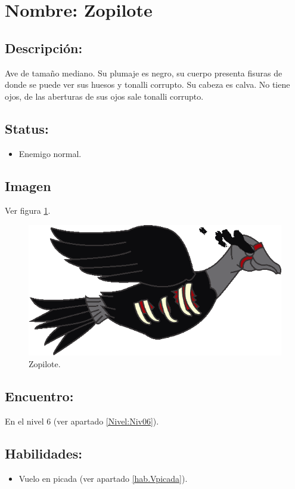 \section{Nombre: Zopilote}   \label{per:zopilote}
\subsection{Descripción:}
Ave de tamaño mediano. Su plumaje es negro, su cuerpo presenta fisuras de donde se puede ver sus huesos y tonalli corrupto. Su cabeza es calva. No tiene ojos, de las aberturas de sus ojos sale tonalli corrupto. 
\subsection{Status:}
\begin{itemize}
	\item Enemigo normal.
\end{itemize}
\subsection{Imagen}
Ver figura \ref{fig:zopilote}.
\begin{figure}
	\centering
	\includegraphics[height=0.2 \textheight]{Imagenes/zopilote}
	\caption{Zopilote.}
	\label{fig:zopilote}
\end{figure}
\subsection{Encuentro:}
En el nivel 6 (ver apartado \ref{Nivel:Niv06}).
\subsection{Habilidades:}
\begin{itemize}
	\item Vuelo en picada (ver apartado \ref{hab.Vpicada}).
\end{itemize}
